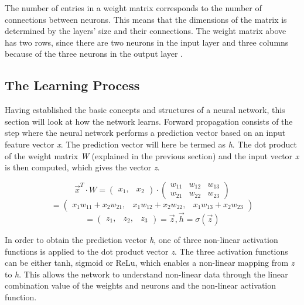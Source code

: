 \indent\newline 
The number of entries in a weight matrix corresponds to the number of connections between neurons. This means that the dimensions of the matrix is determined by the layers' size and their connections. The weight matrix above has two rows, since there are two neurons in the input layer and three columns because of the three neurons in the output layer \cite{opper}.

\subsection{The Learning Process}
Having established the basic concepts and structures of a neural network, this section will look at how the network learns. Forward propagation consists of the step where the neural network performs a prediction vector based on an input feature vector \textit{x}. The prediction vector will here be termed as \textit{h}. The dot product of the weight matrix \textit{W} (explained in the previous section) and the input vector \textit{x} is then computed, which gives the vector \textit{z}.

\begin{equation}
\overrightarrow{x}^{T} \cdot W = \begin{pmatrix} x_{1}, & x_{2}
\end{pmatrix} \cdot \begin{pmatrix}
w_{11} & w_{12} & w_{13}\\
w_{21} & w_{22} & w_{23}
\end{pmatrix}
\end{equation}  
\[= \begin{pmatrix}
x_{1}w_{11}+x_{2}w_{21}, & x_{1}w_{12}+x_{2}w_{22}, & x_{1}w_{13}+x_{2}w_{23}
\end{pmatrix}\]
\[= \begin{pmatrix}
z_{1}, & z_{2}, & z_{3}
\end{pmatrix} = \overrightarrow{z}, \overrightarrow{h} = \sigma(\overrightarrow{z})\]

\indent\newline 
In order to obtain the prediction vector \textit{h}, one of three non-linear activation functions is applied to the dot product vector \textit{z}. The three activation functions can be either tanh, sigmoid or ReLu, which enables a non-linear mapping from \textit{z} to \textit{h}. This allows the network to understand non-linear data through the linear combination value of the weights and neurons and the non-linear activation function.

